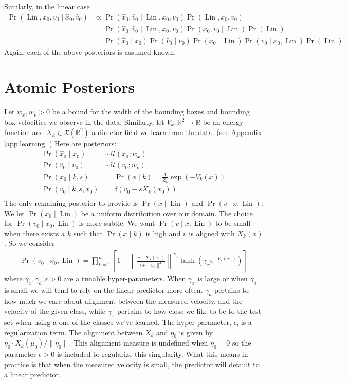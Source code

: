 \documentclass[12pt]{amsart}
\DeclareMathOperator{\Lin}{Lin}
\begin{document}
Similarly, in the linear case
\begin{align*}
	\Pr( \Lin , x_0, v_0 \mid \hat{x}_0, \hat{v}_0 ) &\propto \Pr( \hat{x}_0, \hat{v}_0 \mid \Lin, x_0, v_0 ) \Pr( \Lin, x_0, v_0 ) \\
	&= \Pr( \hat{x}_0, \hat{v}_0 \mid \Lin, x_0, v_0 ) \Pr( x_0, v_0 \mid \Lin ) \Pr(\Lin) \\
	&= \Pr( \hat{x}_0 \mid x_0 ) \Pr( \hat{v}_0 \mid v_0 ) \Pr( x_0 \mid \Lin ) \Pr( v_0 \mid x_0, \Lin ) \Pr(\Lin).
\end{align*}
Again, each of the above posteriors is assumed known.

\appendix

\section{Atomic Posteriors}
Let $w_x, w_v  > 0$ be a bound for the width of the bounding boxes and bounding box velocities we observe in the data.
Similarly, let $V_k: \mathbb{R}^2 \to \mathbb{R}$ be an energy function and $X_k \in \mathfrak{X}( \mathbb{R}^2)$ a director field we learn from the data. (see Appendix \ref{app:learning} )
Here are posteriors:
\begin{align*}
	\Pr( \hat{x}_0 \mid x_0 ) &\sim \mathcal{U}( x_0 ; w_x ) \\
	\Pr( \hat{v}_0 \mid v_0 ) &\sim \mathcal{U}( v_0 ; w_v ) \\
	\Pr( x_0 \mid k,s ) &= \Pr(x \mid k) = \frac{1}{Z_k} \exp \left( -V_k(x) \right) \\
	\Pr( v_0 \mid k,s,x_0) &= \delta( v_0 - s X_k(x_0) ) \\
\end{align*}
The only remaining posterior to provide is $\Pr( x \mid \Lin )$ and $\Pr( v \mid x,\Lin )$.
We let $\Pr( x_0 \mid \Lin)$ be a uniform distribution over our domain.
The choice for $\Pr( v_0 \mid x_0,\Lin)$ is more subtle.
We want $\Pr(v \mid x, \Lin )$ to be small when there exists a $k$ such that $\Pr(x \mid k)$ is high and $v$ is aligned with $X_k(x)$.
So we consider 
\begin{align}
	\Pr( v_0 \mid x_0 , \Lin ) = \prod_{k=1}^n \left[ 1 - \left\| \frac{ v_0 \cdot X_{k}(x_0) }{ \epsilon + \| v_0 \|^2} \right\|^{\gamma_a} \tanh \left( \gamma_x e^{ - V_{k}(x_0) } \right)  \right] \label{eq:v given x and Linear}
\end{align}
where $\gamma_x, \gamma_a, \epsilon > 0$ are a tunable hyper-parameters.
When $\gamma_x$ is large or when $\gamma_a$ is small we will tend to rely on the linear predictor more often.
$\gamma_a$ pertains to how much we care about alignment between the measured velocity, and the velocity of the given class, while $\gamma_x$ pertains to how close we like to be to the test set when using a one of the classes we've learned.
The hyper-parameter, $\epsilon$, is a regularization term.  The alignment between $X_{k}$ and $\eta_0$ is given by $\eta_0 \cdot X_{k}(\mu_0) / \| \eta_0 \|$.  This alignment measure is undefined when $\eta_0 = 0$ so the parameter $\epsilon > 0$ is included to regularize this singularity.  What this means in practice is that when the measured velocity is small, the predictor will default to a linear predictor.
\end{document}
